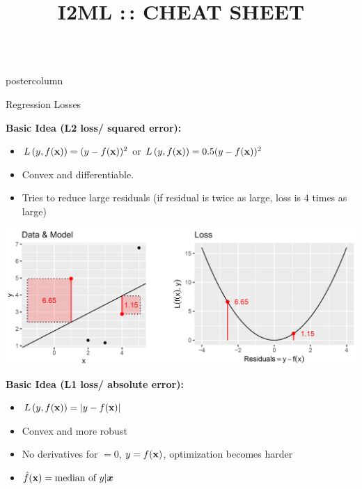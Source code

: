 \documentclass{beamer}
\title{I2ML :\,: CHEAT SHEET} %
\begin{document}
\begin{frame}[fragile]{}
\begin{columns}
	\begin{column}{.31\textwidth}
		\begin{beamercolorbox}[center]{postercolumn}
			\begin{minipage}{.98\textwidth}
				\parbox[t][\columnheight]{\textwidth}{
					\begin{myblock}{Regression Losses}
						\begin{codebox}
			\textbf{Basic Idea (L2 loss/ squared error):}
						\end{codebox}
						
						\begin{itemize}[$\bullet$]     
						\setlength{\itemindent}{+.3in}
              \item $L\left(y, f(\mathbf{x})\right) = (y-f(\mathbf{x}))^2$ or $L\left(y, f(\mathbf{x})\right) = 0.5 (y-f(\mathbf{x}))^2$
              \item Convex and differentiable.
              \item Tries to reduce large residuals (if residual is twice as large, loss is 4 times as large)      
            \end{itemize}

            \vspace*{1ex}
            \includegraphics[width=1\columnwidth]{img/reg_loss.PNG}

\begin{codebox}
\textbf{Basic Idea (L1 loss/ absolute error):}
\end{codebox}

\begin{itemize}[$\bullet$]     \setlength{\itemindent}{+.3in}
\item $L\left(y, f(\mathbf{x})\right) = |y-f(\mathbf{x})|$
  \item Convex and more robust
\item No derivatives for $ = 0$, $y = f(\mathbf{x})$, optimization becomes harder
\item $\hat{f}(\mathbf{x}) = \text{median of } y | \bm{x}$      
  \end{itemize}


\end{myblock}}
\end{minipage}
\end{beamercolorbox}
\end{column}
\end{columns}
\end{frame}
\end{document}

